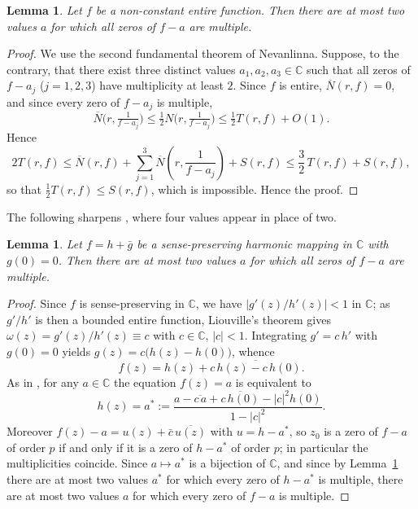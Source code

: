 \documentclass[11pt,reqno]{amsart}
\newtheorem{lemma}[theorem]{Lemma}
\theoremstyle{definition}
\newcommand{\C}{\mathbb{C}}
\begin{document}
\begin{lemma}\label{lem:entiretwo}
Let $f$ be a non-constant entire function. Then there are at most two values $a$ for which
all zeros of $f-a$ are multiple.
\end{lemma}

\begin{proof}
We use the second fundamental theorem of Nevanlinna. Suppose, to the contrary, that there
exist three distinct values $a_{1},a_{2},a_{3}\in\C$ such that all zeros of $f-a_{j}$
($j=1,2,3$) have multiplicity at least $2$. Since $f$ is entire, $\overline N(r,f)=0$, and
since every zero of $f-a_{j}$ is multiple,
$$\overline N\!\big(r,\tfrac{1}{f-a_{j}}\big)\le\tfrac12 N\!\big(r,\tfrac{1}{f-a_{j}}\big)
\le\tfrac12 T(r,f)+O(1).$$ Hence
\[
2T(r,f)\le \overline N(r,f)+\sum_{j=1}^{3}\overline N\!\left(r,\frac{1}{f-a_{j}}\right)+S(r,f)
\le \frac32\,T(r,f)+S(r,f),
\]
so that $\tfrac12 T(r,f)\le S(r,f)$, which is impossible. Hence the proof.
\end{proof}

The following sharpens \cite[Lemma~3]{DPQ}, where four values appear in place of two.

\begin{lemma}\label{lem:harmtwo}
Let $f=h+\bar g$ be a sense-preserving harmonic mapping in $\C$ with $g(0)=0$. Then there
are at most two values $a$ for which all zeros of $f-a$ are multiple.
\end{lemma}

\begin{proof}
Since $f$ is sense-preserving in $\C$, we have $|g'(z)/h'(z)|<1$ in $\C$; as $g'/h'$ is then
a bounded entire function, Liouville's theorem gives $\omega(z)=g'(z)/h'(z)\equiv c$ with
$c\in\C$, $|c|<1$. Integrating $g'=c\,h'$ with $g(0)=0$ yields $g(z)=c\big(h(z)-h(0)\big)$,
whence
\[
f(z)=h(z)+\overline{c\,h(z)-c\,h(0)}.
\]
As in \cite[Lemma~2.5]{BDP}, for any $a\in\C$ the equation $f(z)=a$ is equivalent to
\begin{equation}\label{eq:correspond}
h(z)=a^{*}:=\frac{a-\overline{c\,a}+\overline{c\,h(0)}-|c|^{2}h(0)}{1-|c|^{2}}.
\end{equation}
Moreover $f(z)-a=u(z)+\bar c\,\overline{u(z)}$ with $u=h-a^{*}$, so $z_{0}$ is a zero of
$f-a$ of order $p$ if and only if it is a zero of $h-a^{*}$ of order $p$; in particular the
multiplicities coincide. Since $a\mapsto a^{*}$ is a bijection of $\C$, and since by
Lemma~\ref{lem:entiretwo} there are at most two values $a^{*}$ for which every zero of
$h-a^{*}$ is multiple, there are at most two values $a$ for which every zero of $f-a$ is
multiple.
\end{proof}
\end{document}
